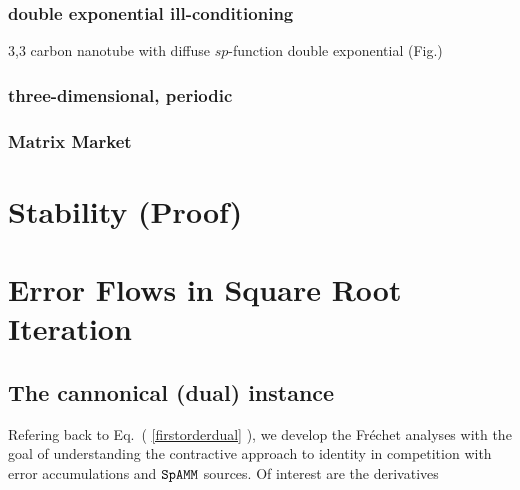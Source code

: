 \documentclass[letterpaper,twocolumn,amsmath,amsfont,amssymb,english,aps,jcp,preprintnumbers,groupaddress,nofootinbib,tightenlines,floatfix]{revtex4}
\newcommand{\mat}[1]{\boldsymbol{#1}}
\theoremstyle{plain}
\theoremstyle{remark}
\theoremstyle{plain}
\begin{document}
\subsubsection{double exponential ill-conditioning}
3,3 carbon nanotube with diffuse $sp$-function
double exponential (Fig.)

\subsubsection{three-dimensional, periodic}
\subsubsection{Matrix Market}

\section{Stability (Proof)}

\section{Error Flows in Square Root Iteration}

\subsection{The cannonical (dual) instance}
 
Refering back to Eq.~( \ref{firstorderdual} ), we develop the Fr\'{e}chet analyses \cite{} with the goal of understanding
the contractive approach to identity in competition with error accumulations and $\tt SpAMM$ sources.
Of interest are the derivatives 

\end{document}
